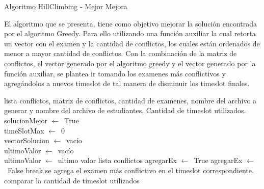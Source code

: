\begin{algorithm}[H]  
  \caption{Algoritmo HillClimbing - Mejor Mejora} 
  El algoritmo que se presenta, tiene como objetivo mejorar la solución encontrada por el algoritmo Greedy. Para ello utilizando una función auxiliar la cual retorta un vector con el examen y la cantidad de conflictos, los cuales están ordenados de menor a mayor cantidad de conflictos. Con la combinación de la matriz de conflictos, el vector generado por el algoritmo greedy y el vector generado por la función auxiliar, se plantea ir tomando los examenes más conflictivos y agregándolos a nuevos timeslot de tal manera de disminuir los timeslot finales.
  \label{alg:Framwork}  
  \begin{algorithmic}  
    \Require  
    lista conflictos, matriz de conflictos, cantidad de examenes, nombre del archivo a generar y nombre del archivo de estudiantes, 
    \Ensure  
   Cantidad de timeslot utilizados.\\
   solucionMejor $\leftarrow $\ True\\
   timeSlotMax $\leftarrow $\ 0\\
   vectorSolucion $\leftarrow $\ vacío\\
   ultimoValor $\leftarrow $\ vacío\\
   
       \State ultimoValor $\leftarrow $\ ultimo valor lista conflictos
            \State agregarEx $\leftarrow $\ True
                    \State agregarEx $\leftarrow $\ False
                    \State break
                \EndIf
            \EndFor
                \State se agrega el examen más conflictivo en el timeslot correspondiente.
            \EndIf
        \EndFor
        \State comparar la cantidad de timeslot utilizados
    \EndWhile
            
    
   
  \end{algorithmic}  
\end{algorithm}

